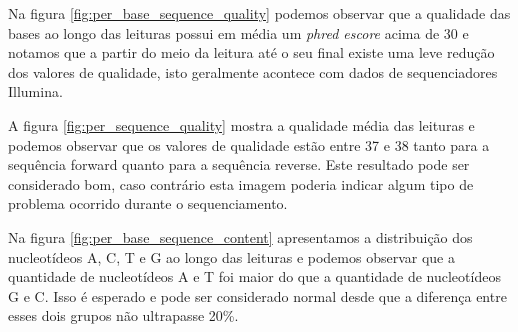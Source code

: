 Na figura \ref{fig:per_base_sequence_quality} podemos observar que a qualidade das bases ao longo das leituras possui em média um \textit{phred escore} acima de 30 e notamos que a partir do meio da leitura até o seu final existe uma leve redução dos valores de qualidade, isto geralmente acontece com dados de sequenciadores Illumina.

A figura \ref{fig:per_sequence_quality} mostra a qualidade média das leituras e podemos observar que os valores de qualidade estão entre 37 e 38 tanto para a sequência forward quanto para a sequência reverse. Este resultado pode ser considerado bom, caso contrário esta imagem poderia indicar algum tipo de problema ocorrido durante o sequenciamento.

Na figura \ref{fig:per_base_sequence_content} apresentamos a distribuição dos nucleotídeos A, C, T e G ao longo das leituras e podemos observar que a quantidade de nucleotídeos A e T foi maior do que a quantidade de nucleotídeos G e C. Isso é esperado e pode ser considerado normal desde que a diferença entre esses dois grupos não ultrapasse 20\%.


